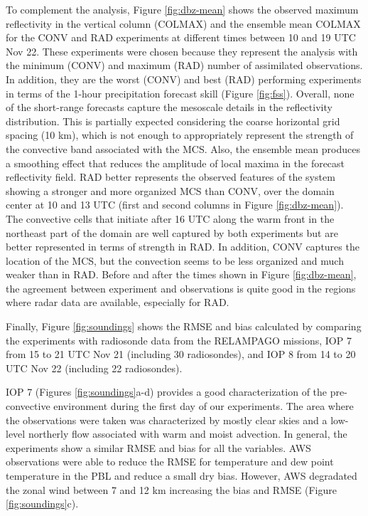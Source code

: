 \documentclass[authoryear,preprint,review,12pt]{elsarticle} %
\begin{document}
To complement the analysis, Figure \ref{fig:dbz-mean} shows the observed maximum reflectivity in the vertical column (COLMAX) and the ensemble mean COLMAX for the CONV and RAD experiments at different times between 10 and 19 UTC Nov 22. These experiments were chosen because they represent the analysis with the minimum (CONV) and maximum (RAD) number of assimilated observations. In addition, they are the worst (CONV) and best (RAD) performing experiments in terms of the 1-hour precipitation forecast skill (Figure \ref{fig:fss}). Overall, none of the short-range forecasts capture the mesoscale details in the reflectivity distribution. This is partially expected considering the coarse horizontal grid spacing (10 km), which is not enough to appropriately represent the strength of the convective band associated with the MCS. Also, the ensemble mean produces a smoothing effect that reduces the amplitude of local maxima in the forecast reflectivity field. RAD better represents the observed features of the system showing a stronger and more organized MCS than CONV, over the domain center at 10 and 13 UTC (first and second columns in Figure \ref{fig:dbz-mean}). The convective cells that initiate after 16 UTC along the warm front in the northeast part of the domain are well captured by both experiments but are better represented in terms of strength in RAD. In addition, CONV captures the location of the MCS, but the convection seems to be less organized and much weaker than in RAD. Before and after the times shown in Figure \ref{fig:dbz-mean}, the agreement between experiment and observations is quite good in the regions where radar data are available, especially for RAD.

Finally, Figure \ref{fig:soundings} shows the RMSE and bias calculated by comparing the experiments with radiosonde data from the RELAMPAGO missions, IOP 7 from 15 to 21 UTC Nov 21 (including 30 radiosondes), and IOP 8 from 14 to 20 UTC Nov 22 (including 22 radiosondes).

IOP 7 (Figures \ref{fig:soundings}a-d) provides a good characterization of the pre-convective environment during the first day of our experiments. The area where the observations were taken was characterized by mostly clear skies and a low-level northerly flow associated with warm and moist advection. In general, the experiments show a similar RMSE and bias for all the variables. AWS observations were able to reduce the RMSE for temperature and dew point temperature in the PBL and reduce a small dry bias. However, AWS degradated the zonal wind between 7 and 12 km increasing the bias and RMSE (Figure \ref{fig:soundings}c).
\end{document}
